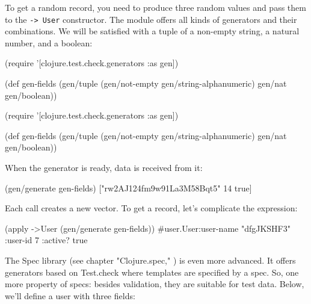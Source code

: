 \fi

To get a random record, you need to produce three random values and pass them to the \verb|-> User| constructor. The module offers all kinds of generators and their combinations. We will be satisfied with a tuple of a non-empty string, a natural number, and a boolean:

\ifx\DEVICETYPE\MOBILE

\begin{english}
  \begin{clojure}
(require
 '[clojure.test.check.generators
   :as gen])

(def gen-fields
  (gen/tuple
    (gen/not-empty
      gen/string-alphanumeric)
    gen/nat
    gen/boolean))
  \end{clojure}
\end{english}

\else

\begin{english}
  \begin{clojure}
(require '[clojure.test.check.generators :as gen])

(def gen-fields
  (gen/tuple (gen/not-empty gen/string-alphanumeric)
             gen/nat
             gen/boolean))
  \end{clojure}
\end{english}

\fi

When the generator is ready, data is received from it:

\begin{english}
  \begin{clojure}
(gen/generate gen-fields)
["rw2AJ124fm9w91La3M58Bqt5" 14 true]
  \end{clojure}
\end{english}

\noindent
Each call creates a new vector. To get a record, let's complicate the expression:

\begin{english}
  \begin{clojure}
(apply ->User (gen/generate gen-fields))
#user.User{:user-name "dfgJKSHF3"
           :user-id 7
           :active? true}
  \end{clojure}
\end{english}

The Spec library (see chapter "Clojure.spec," ) is even more advanced. It offers generators based on Test.check where templates are specified by a spec. So, one more property of specs: besides validation, they are suitable for test data. Below, we'll define a user with three fields:

